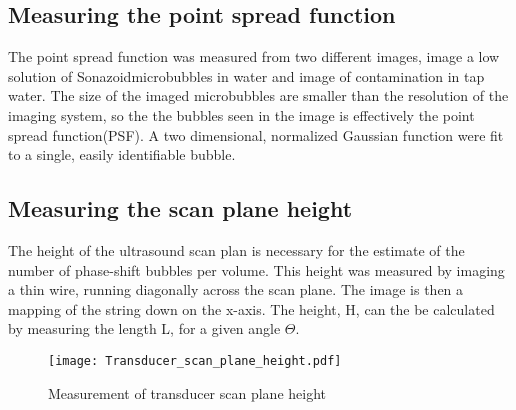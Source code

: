 \subsection*{Measuring the point spread function}
The point spread function was measured from two different images, image a low solution of Sonazoid\texttrademark microbubbles in water and image of contamination in tap water. The size of the imaged microbubbles are smaller than the resolution of the imaging system, so the the bubbles seen in the image is effectively the point spread function(PSF). A two dimensional, normalized Gaussian function were fit to a single, easily identifiable bubble. 

 
\subsection*{Measuring the scan plane height}
The height of the ultrasound scan plan is necessary for the estimate of the number of phase-shift bubbles per volume. This height was measured by imaging a thin wire, running diagonally across the scan plane. The image is then a mapping of the string down on the x-axis. The height, H,  can the be calculated by measuring the length L, for a given angle $\Theta$.

\begin{figure}[h]
  \centering
  \texttt{[image: Transducer\_scan\_plane\_height.pdf]}
  \caption{Measurement of transducer scan plane height}
\end{figure}


